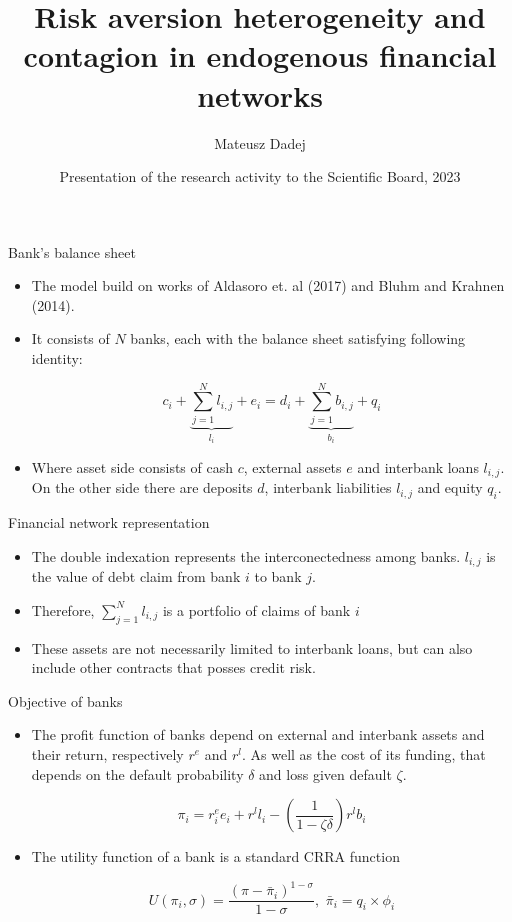 \documentclass{beamer}
\title{Risk aversion heterogeneity and contagion in
endogenous financial networks}
\author{Mateusz Dadej}
\institute{University of Brescia}
\date[VLC 2023] %
{Presentation of the research activity to the Scientific Board, 2023}
\begin{document}
\begin{frame}{Bank's balance sheet}

    \begin{itemize}
        \item The model build on works of Aldasoro et. al (2017) and Bluhm and Krahnen (2014). %
        \item It consists of $N$ banks, each with the balance sheet satisfying following identity:
        
        \[c_i + \underbrace{\sum_{j=1}^{N}l_{i,j}}_{l_i} + e_i = d_i + \underbrace{\sum_{j=1}^{N}b_{i,j}}_{b_i} + q_i\]

        \item Where asset side consists of cash $c$, external assets $e$ and interbank loans $l_{i,j}$. On the other side there are deposits $d$, interbank liabilities $l_{i,j}$ and equity $q_i$.
        
    \end{itemize}

\end{frame}

\begin{frame}{Financial network representation}

    \begin{itemize}
        \item The double indexation represents the interconectedness among banks. $l_{i,j}$ is the value of debt claim from bank $i$ to bank $j$.
        \item Therefore, $\sum_{j=1}^{N}l_{i,j}$ is a portfolio of claims of bank $i$
        \item These assets are not necessarily limited to interbank loans, but can also include other contracts that posses credit risk.
    \end{itemize}   

\end{frame}

\begin{frame}{Objective of banks}

    \begin{itemize}
        \item The profit function of banks depend on external and interbank assets and their return, respectively $r^e$ and $r^l$. As well as the cost of its funding, that depends on the default probability $\delta$ and loss given default $\zeta$.
        
        \[\pi_i = r_{i}^e e_i + r^l l_i - \left(\frac{1}{1 - \zeta \delta}\right) r^l b_i\]

        \item The utility function of a bank is a standard CRRA function
        
        \[U(\pi_i, \sigma) = \frac{(\pi - \bar{\pi}_i)^{1-\sigma}}{1 - \sigma}, \,\, \bar{\pi}_i = q_i \times \phi_i\]


    \end{itemize}
    
\end{frame}
\end{document}
